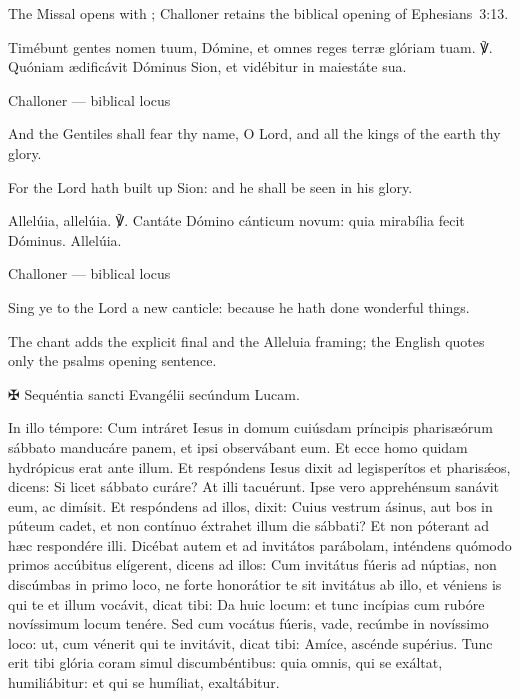 The Missal opens with ; Challoner retains the biblical opening of Ephesians~3:13.



Timébunt gentes nomen tuum, Dómine, et omnes reges terræ glóriam tuam.
℣. Quóniam ædificávit Dóminus Sion, et vidébitur in maiestáte sua.

\finishfulltextelement

\begin{fulltextenglish}{Challoner --- biblical locus}

And the Gentiles shall fear thy name, O Lord, and all the kings of the earth thy glory.

For the Lord hath built up Sion: and he shall be seen in his glory.

\end{fulltextenglish}



Allelúia, allelúia. ℣. Cantáte Dómino cánticum novum: quia mirabília fecit
Dóminus. Allelúia.

\finishfulltextelement

\begin{fulltextenglish}{Challoner --- biblical locus}

Sing ye to the Lord a new canticle: because he hath done wonderful things.

\end{fulltextenglish}

The chant adds the explicit final  and the Alleluia framing; the English quotes only the psalm\textquotesingle s opening sentence.



✠ Sequéntia sancti Evangélii secúndum Lucam.

In illo témpore: Cum intráret Iesus in domum cuiúsdam príncipis
pharisæórum sábbato manducáre panem, et ipsi observábant eum. Et ecce
homo quidam hydrópicus erat ante illum. Et respóndens Iesus dixit ad
legisperítos et pharisǽos, dicens: Si licet sábbato curáre? At illi
tacuérunt. Ipse vero apprehénsum sanávit eum, ac dimísit. Et respóndens
ad illos, dixit: Cuius vestrum ásinus, aut bos in púteum cadet, et non
contínuo éxtrahet illum die sábbati? Et non póterant ad hæc respondére
illi. Dicébat autem et ad invitátos parábolam, inténdens quómodo primos
accúbitus elígerent, dicens ad illos: Cum invitátus fúeris ad núptias, non
discúmbas in primo loco, ne forte honorátior te sit invitátus ab illo, et
véniens is qui te et illum vocávit, dicat tibi: Da huic locum: et tunc
incípias cum rubóre novíssimum locum tenére. Sed cum vocátus fúeris,
vade, recúmbe in novíssimo loco: ut, cum vénerit qui te invitávit, dicat
tibi: Amíce, ascénde supérius. Tunc erit tibi glória coram simul
discumbéntibus: quia omnis, qui se exáltat, humiliábitur: et qui se
humíliat, exaltábitur.

